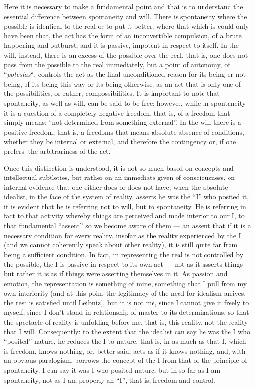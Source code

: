 \begin{quotex}
Here it is necessary to make a fundamental point and that is to understand the essential difference between spontaneity and will. There is spontaneity where the possible is identical to the real or to put it better, where that which is could only have been that, the act has the form of an inconvertible compulsion, of a brute happening and outburst, and it is passive, impotent in respect to itself. In the will, instead, there is an excess of the possible over the real, that is, one does not pass from the possible to the real immediately, but a point of autonomy, of ``\emph{potestas}``, controls the act as the final unconditioned reason for its being or not being, of its being this way or its being otherwise, as an act that is only one of the possibilities, or rather, compossibilities. It is important to note that spontaneity, as well as will, can be said to be free: however, while in spontaneity it is a question of a completely negative freedom, that is, of a freedom that simply means: ``not determined from something external''. In the will there is a positive freedom, that is, a freedoms that means absolute absence of conditions, whether they be internal or external, and therefore the contingency or, if one prefers, the arbitrariness of the act.

Once this distinction is understood, it is not so much based on concepts and intellectual subtleties, but rather on an immediate given of consciousness, on internal evidence that one either does or does not have; when the absolute idealist, in the face of the system of reality, asserts he was the ``I'' who posited it, it is evident that he is referring not to will, but to spontaneity. He is referring in fact to that activity whereby things are perceived and made interior to our I, to that fundamental ``assent'' so we become aware of them --- an assent that if it is a necessary condition for every reality, insofar as the reality experienced by the I (and we cannot coherently speak about other reality), it is still quite far from being a sufficient condition. In fact, in representing the real is not controlled by the possible, the I is passive in respect to its own act --- not as it asserts things but rather it is as if things were asserting themselves in it. As passion and emotion, the representation is something of mine, something that I pull from my own interiority (and at this point the legitimacy of the need for idealism arrives, the rest is satisfied until Leibniz), but it is not me, since I cannot give it freely to myself, since I don't stand in relationship of master to its determinations, so that the spectacle of reality is unfolding before me, that is, this reality, not the reality that I will. Consequently: to the extent that the idealist can say he was the I who ``posited'' nature, he reduces the I to nature, that is, in as much as that I, which is freedom, knows nothing, or, better said, acts as if it knows nothing, and, with an obvious paralogism, borrows the concept of the I from that of the principle of spontaneity. I can say it was I who posited nature, but in so far as I am spontaneity, not as I am properly an ``I'', that is, freedom and control.
\end{quotex}

